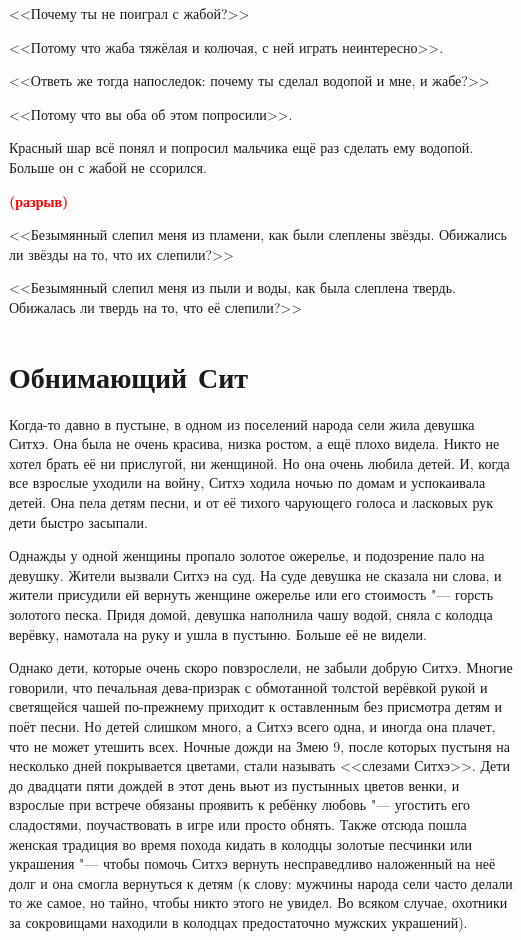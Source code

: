 \documentclass[a4paper,10pt]{book}
\newcommand{\spacing}{\textcolor{red}{\textbf{(разрыв)}}}
\begin{document}
<<Почему ты не поиграл с жабой?>>

<<Потому что жаба тяжёлая и колючая, с ней играть неинтересно>>.

<<Ответь же тогда напоследок: почему ты сделал водопой и мне, и жабе?>>

<<Потому что вы оба об этом попросили>>.

Красный шар всё понял и попросил мальчика ещё раз сделать ему водопой. Больше 
он 
с жабой не ссорился.

\spacing

<<Безымянный слепил меня из пламени, как были слеплены звёзды. Обижались ли 
звёзды на то, что их слепили?>>

<<Безымянный слепил меня из пыли и воды, как была слеплена твердь. Обижалась ли 
твердь на то, что её слепили?>>

\section{Обнимающий Сит}

Когда-то давно в пустыне, в одном из поселений народа сели 
жила девушка Ситхэ. Она была не очень красива, низка ростом, а ещё плохо 
видела. Никто не хотел брать её ни прислугой, ни женщиной. Но она очень любила 
детей. И, когда все взрослые уходили на войну, Ситхэ ходила ночью по домам и 
успокаивала детей. Она пела детям песни, и от её тихого чарующего голоса и 
ласковых рук дети быстро засыпали.

Однажды у одной женщины пропало золотое ожерелье, и подозрение 
пало на девушку. Жители вызвали Ситхэ на суд. На суде девушка не сказала ни 
слова, и жители присудили ей вернуть женщине ожерелье или его стоимость "--- 
горсть золотого песка. Придя домой, девушка наполнила чашу водой, сняла с 
колодца верёвку, намотала на руку и ушла в пустыню. 
Больше её не видели.

Однако дети, которые очень скоро повзрослели, не забыли добрую Ситхэ. Многие 
говорили, что печальная дева-призрак с обмотанной толстой верёвкой рукой и 
светящейся чашей по-прежнему приходит к оставленным без присмотра детям и поёт 
песни. Но детей слишком много, а Ситхэ всего одна, и иногда она плачет, что не 
может утешить всех. Ночные дожди на Змею 9, после которых пустыня на несколько 
дней покрывается цветами, стали называть <<слезами Ситхэ>>. Дети до двадцати 
пяти дождей в этот день вьют из пустынных цветов венки, и взрослые при встрече 
обязаны проявить к ребёнку любовь "--- угостить его сладостями, поучаствовать в 
игре или просто обнять. Также отсюда пошла женская традиция во время похода 
кидать в колодцы золотые песчинки или украшения "--- чтобы помочь Ситхэ вернуть 
несправедливо наложенный на неё долг и она смогла вернуться к детям (к слову: 
мужчины народа сели часто делали то же самое, но тайно, чтобы никто этого не 
увидел. Во всяком случае, охотники за сокровищами находили в колодцах 
предостаточно мужских украшений).
\end{document}
